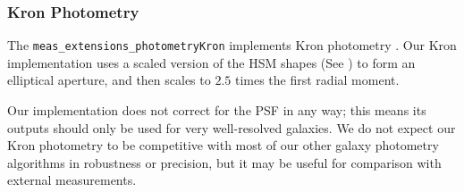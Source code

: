 \subsubsection{Kron Photometry}
\label{sec:kron}

The \texttt{meas\_extensions\_photometryKron} implements Kron photometry \citep{1980ApJS...43..305K}.
Our Kron implementation uses a scaled version of the HSM shapes (See ) to form an elliptical aperture, and then scales to $2.5$ times the first radial moment.

Our implementation does not correct for the PSF in any way; this means its outputs should only be used for very well-resolved galaxies.
We do not expect our Kron photometry to be competitive with most of our other galaxy photometry algorithms in robustness or precision, but it may be useful for comparison with external measurements.
